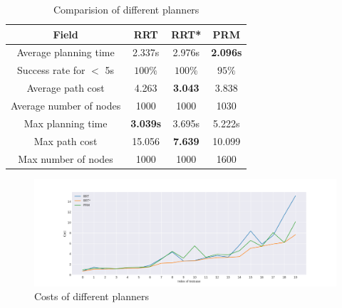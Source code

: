 \documentclass[11pt]{article}
\begin{document}
\begin{table}[H]
    \begin{center}
        \caption*{Comparision of different planners}
        \vspace{-2mm}
        \begin{tabular}{|c|c|c|c|}
            \hline
             Field &  \textbf{RRT} & \textbf{RRT*} & \textbf{PRM} \\
            \hline
            Average planning time  &  2.337s & 2.976s   &  \textbf{2.096s} \\
            \hline
            Success rate for $<$ 5s   &  $100 \%$ & $100 \%$ &  $95 \%$\\
            \hline   
            Average path cost   &  4.263 & \textbf{3.043 }  &  3.838\\
            \hline     		
            Average number of nodes   &  1000 & 1000   &  1030\\
            \hline     	
            Max planning time  &  \textbf{3.039s} & 3.695s   &  5.222s \\
            \hline
            Max path cost   &  15.056 & \textbf{7.639 }  &  10.099\\
            \hline     		
            Max number of nodes   &  1000 & 1000   &  1600\\
            \hline     		
        \end{tabular}
    \end{center}
 \end{table}
\vspace*{-7mm}
 \begin{figure}[H]
    \centering
    \includegraphics[width=\linewidth]{plot1_1000.png}
    \caption*{Costs of different planners}
\end{figure}
\end{document}
